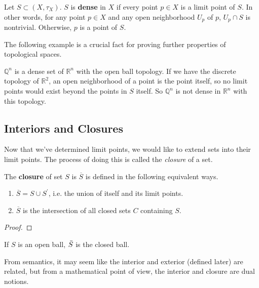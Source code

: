   \begin{definition}
    Let $S \subset (X, \tau_X)$. $S$ is \textbf{dense} in $X$ if every point $p \in X$ is a limit point of $S$. In other words, for any point $p \in X$ and any open neighborhood $U_p$ of $p$, $U_p \cap S$ is nontrivial. Otherwise, $p$ is a point of $S$. 
  \end{definition}

  The following example is a crucial fact for proving further properties of topological spaces. 

  \begin{example}
    $\mathbb{Q}^{n}$ is a dense set of $\mathbb{R}^{n}$ with the open ball topology. If we have the discrete topology of $\mathbb{R}^{2}$, an open neighborhood of a point is the point itself, so no limit points would exist beyond the points in $S$ itself. So $\mathbb{Q}^{n}$ is not dense in $\mathbb{R}^{n}$ with this topology. 
  \end{example}

\subsection{Interiors and Closures}

  Now that we've determined limit points, we would like to extend sets into their limit points. The process of doing this is called the \textit{closure} of a set. 

  \begin{definition}[Closure]
    The \textbf{closure} of set $S$ is $\overline{S}$ is defined in the following equivalent ways. 
    \begin{enumerate}
      \item $\overline{S} = S \cup S^\prime$, i.e. the union of itself and its limit points. 
      \item $\overline{S}$ is the intersection of all closed sets $C$ containing $S$. 
    \end{enumerate}
  \end{definition}
  \begin{proof}
    
  \end{proof}

  \begin{example}
    If $S$ is an open ball, $\Bar{S}$ is the closed ball. 
  \end{example}

  From semantics, it may seem like the interior and exterior (defined later) are related, but from a mathematical point of view, the interior and closure are dual notions. 

